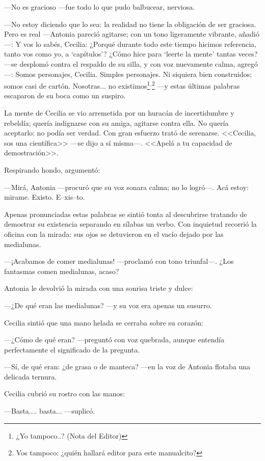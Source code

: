 ---No es gracioso ---fue todo lo que pudo balbucear, nerviosa.

---No estoy diciendo que lo sea: la realidad no tiene la obligación de
ser graciosa. Pero es real ---Antonia pareció agitarse; con un tono
ligeramente vibrante, añadió---: Y vos lo sabés, Cecilia: ¿Porqué
durante todo este tiempo hicimos referencia, tanto vos como yo, a
`capítulos'? ¿Cómo hice para `leerte la mente' tantas veces? ---se
desplomó contra el respaldo de su silla, y con voz nuevamente calma,
agregó---: Somos personajes, Cecilia. Simples personajes. Ni siquiera
bien construidos; somos casi de cartón. Nosotras... no
existimos\footnote{¿Yo tampoco..?  (Nota del Editor)}$^,$\footnote{Vos
  tampoco: ¿quién hallará editor para este manualcito?} ---y estas
últimas palabras escaparon de su boca como un suspiro.

La mente de Cecilia se vio arremetida por un huracán de incertidumbre
y rebeldía; quería indignarse con su amiga, agitarse contra ella. No
quería aceptarlo: no podía ser verdad. Con gran esfuerzo trató de
serenarse. <<Cecilia, sos una científica>> ---se dijo a sí
misma---. <<Apelá a tu capacidad de demostración>>.

Respirando hondo, argumentó:

---Mirá, Antonia ---procuró que su voz sonara calma; no lo
logró---. Acá estoy: mirame. Existo. E--xis--to.

Apenas pronunciadas estas palabras se sintió tonta al descubrirse
tratando de demostrar su existencia separando en sílabas un verbo. Con
inquietud recorrió la oficina con la mirada: sus ojos se detuvieron en
el vacío dejado por las medialunas.

---¡Acabamos de comer medialunas!  ---proclamó con tono
triun\-fal---. ¿Los fantasmas comen medialunas, acaso?

Antonia le devolvió la mirada con una sonrisa triste y dulce:

---¿De qué eran las medialunas? ---y su voz era apenas un susurro.

Cecilia sintió que una mano helada se cerraba sobre su corazón:

---¿Cómo de qué eran? ---preguntó con voz quebrada, aunque entendía
perfectamente el significado de la pregunta.

---Sí, de qué eran: ¿de grasa o de manteca? ---en la voz de Antonia
flotaba una delicada ternura.

Cecilia cubrió su rostro con las manos:

---Basta.... basta... ---suplicó.

